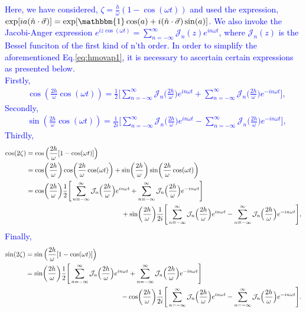 \documentclass[%
reprint,
superscriptaddress,
amsmath,amssymb,showkeys,
aps,
prb,
]{revtex4-2}
\newcommand{\blue}[1]{\textcolor{blue}{#1}}
\begin{document}
\blue{
	Here, we have considered, $\zeta = \frac{h}{\omega}(1-\cos(\omega t))$ and used the expression, $\exp[ia(\hat{n}\cdot\vec{\sigma})] = \exp[\mathbbm{1} \cos(a) + i (\hat{n}\cdot\vec{\sigma})\sin(a)]$. We also invoke the Jacobi-Anger expression $\displaystyle e^{iz\cos(\omega t)} = \sum_{n=-\infty}^{\infty}\mathcal{J}_n(z)e^{in\omega t}$\cite{arfkenmath}, where $\mathcal{J}_n(z)$ is the Bessel funciton of the first kind of n'th order. In order to simplify the aforementioned Eq.\eqref{eq:hmovap1}, it is necessary to ascertain certain expressions as presented below.\\
	Firstly,
	\begin{align}
		&\cos(\frac{2h}{\omega}\cos(\omega t)) = \frac12\Bigg[\sum_{n=-\infty}^{\infty} \mathcal{J}_n\Big(\frac{2h}{\omega}\Big)e^{in\omega t} + \sum_{n=-\infty}^{\infty} \mathcal{J}_n\Big(\frac{2h}{\omega}\Big)e^{-in\omega t}\Bigg],
	\end{align}
	Secondly,
	\begin{align}
		&\sin(\frac{2h}{\omega}\cos(\omega t)) = \frac{1}{2i}\Bigg[\sum_{n=-\infty}^{\infty} \mathcal{J}_n\Big(\frac{2h}{\omega}\Big)e^{in\omega t} - \sum_{n=-\infty}^{\infty} \mathcal{J}_n\Big(\frac{2h}{\omega}\Big)e^{-in\omega t}\Bigg],
	\end{align}
	Thirdly,
	\begin{align}
	\cos(2\zeta) &= \cos\Big(\frac{2h}{\omega}[1-\cos(\omega t)]\Big)\nonumber\\
	&=  \cos(\frac{2h}{\omega})\cos(\frac{2h}{\omega} \cos(\omega t)) + \sin(\frac{2h}{\omega})\sin(\frac{2h}{\omega} \cos(\omega t))\nonumber\\
	&=  \cos(\frac{2h}{\omega})\frac12\Bigg[\sum_{n=-\infty}^{\infty} \mathcal{J}_n\Big(\frac{2h}{\omega}\Big)e^{in\omega t} + \sum_{n=-\infty}^{\infty} \mathcal{J}_n\Big(\frac{2h}{\omega}\Big)e^{-in\omega t}\Bigg] \nonumber\\ & \hskip 5cm + \sin(\frac{2h}{\omega})\frac{1}{2i}\Bigg[\sum_{n=-\infty}^{\infty} \mathcal{J}_n\Big(\frac{2h}{\omega}\Big)e^{in\omega t} - \sum_{n=-\infty}^{\infty} \mathcal{J}_n\Big(\frac{2h}{\omega}\Big)e^{-in\omega t}\Bigg],
	\label{eq:hmovap2}
	\end{align}
	Finally,
	\begin{align}
		\sin(2\zeta) &= \sin\Big(\frac{2h}{\omega}[1-\cos(\omega t)]\Big)\nonumber\\
		&=  \sin(\frac{2h}{\omega})\frac12\Bigg[\sum_{n=-\infty}^{\infty} \mathcal{J}_n\Big(\frac{2h}{\omega}\Big)e^{in\omega t} + \sum_{n=-\infty}^{\infty} \mathcal{J}_n\Big(\frac{2h}{\omega}\Big)e^{-in\omega t}\Bigg] \nonumber\\ & \hskip 5cm - \cos(\frac{2h}{\omega})\frac{1}{2i}\Bigg[\sum_{n=-\infty}^{\infty} \mathcal{J}_n\Big(\frac{2h}{\omega}\Big)e^{in\omega t} - \sum_{n=-\infty}^{\infty} \mathcal{J}_n\Big(\frac{2h}{\omega}\Big)e^{-in\omega t}\Bigg].

\end{align}}
\end{document}
